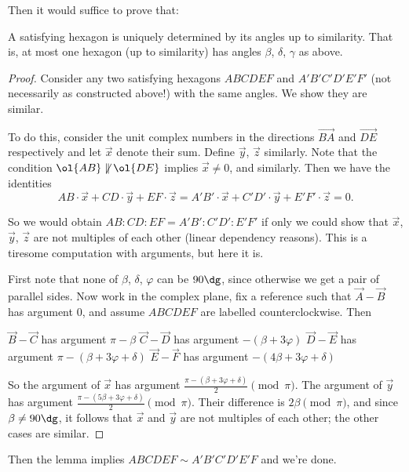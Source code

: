 \documentclass[11pt]{scrartcl}
\begin{document}
Then it would suffice to prove that:
\begin{lemma*}
  A satisfying hexagon is uniquely determined by its angles
  up to similarity.
  That is, at most one hexagon
  (up to similarity) has angles $\beta$, $\delta$, $\gamma$ as above.
\end{lemma*}
\begin{proof}
  Consider any two satisfying hexagons $ABCDEF$ and $A'B'C'D'E'F'$
  (not necessarily as constructed above!) with the same angles.
  We show they are similar.

  To do this, consider the unit complex numbers
  in the directions $\overrightarrow{BA}$ and $\overrightarrow{DE}$
  respectively and let $\vec x$ denote their sum.
  Define $\vec y$, $\vec z$ similarly.
  Note that the condition $\ol{AB} \not\parallel \ol{DE}$
  implies $\vec x \neq 0$, and similarly.
  Then we have the identities
  \[ AB \cdot \vec x + CD \cdot \vec y + EF \cdot \vec z
    = A'B' \cdot \vec x + C'D' \cdot \vec y + E'F' \cdot \vec z
    = 0. \]

  So we would obtain $AB : CD : EF = A'B' : C'D' : E'F'$
  if only we could show that $\vec x$, $\vec y$, $\vec z$
  are not multiples of each other
  (linear dependency reasons).
  This is a tiresome computation with arguments,
  but here it is.

  First note that none of $\beta$, $\delta$, $\varphi$
  can be $90\dg$,
  since otherwise we get a pair of parallel sides.
  Now work in the complex plane,
  fix a reference such that $\vec A - \vec B$ has argument $0$,
  and assume $ABCDEF$ are labelled counterclockwise.
  Then
  \begin{itemize}
    \ii $\vec B - \vec C$ has argument $\pi-\beta$
    \ii $\vec C - \vec D$ has argument $-(\beta+3\varphi)$
    \ii $\vec D - \vec E$ has argument $\pi-(\beta+3\varphi+\delta)$
    \ii $\vec E - \vec F$ has argument $-(4\beta+3\varphi+\delta)$
  \end{itemize}
  So the argument of $\vec x$ has argument
  $\frac{\pi-(\beta+3\varphi+\delta)}{2} \pmod \pi$.
  The argument of $\vec y$ has argument
  $\frac{\pi-(5\beta+3\varphi+\delta)}{2} \pmod \pi$.
  Their difference is $2\beta \pmod \pi$, and since $\beta \neq 90\dg$,
  it follows that $\vec x$ and $\vec y$ are not
  multiples of each other; the other cases are similar.
\end{proof}

Then the lemma implies $ABCDEF \sim A'B'C'D'E'F$ and we're done.
\end{document}
